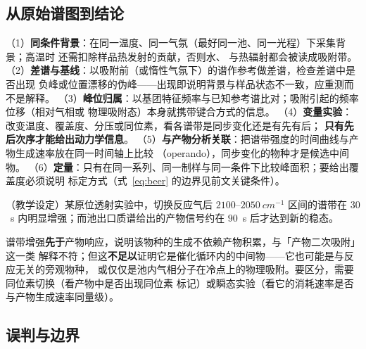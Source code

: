 \subsection{从原始谱图到结论}

\begin{dataflow}
（1）\textbf{同条件背景}：在同一温度、同一气氛（最好同一池、同一光程）下采集背景；高温时
还需扣除样品热发射的贡献，否则水、 与热辐射都会被读成吸附带。
（2）\textbf{差谱与基线}：以吸附前（或惰性气氛下）的谱作参考做差谱，检查差谱中是否出现
负峰或位置漂移的伪峰——出现即说明背景与样品状态不一致，应重测而不是解释。
（3）\textbf{峰位归属}：以基团特征频率与已知参考谱比对；吸附引起的频率位移（相对气相或
物理吸附态）本身就携带键合方式的信息。
（4）\textbf{变量实验}：改变温度、覆盖度、分压或同位素，看各谱带是同步变化还是有先有后；
\textbf{只有先后次序才能给出动力学信息}。
（5）\textbf{与产物分析关联}：把谱带强度的时间曲线与产物生成速率放在同一时间轴上比较
（operando），同步变化的物种才是候选中间物。
（6）\textbf{定量}：只有在同一系列、同一制样与同一条件下比较峰面积；要给出覆盖度必须说明
标定方式（式~\eqref{eq:beer} 的边界见前文关键条件）。
\end{dataflow}

\begin{obs}
（教学设定）某原位透射实验中，切换反应气后 $2100$--$\qty{2050}{cm^{-1}}$ 区间的谱带在
$30$~s 内明显增强；而池出口质谱给出的产物信号约在 $90$~s 后才达到新的稳态。
\end{obs}

\begin{infer}
谱带增强\textbf{先于}产物响应，说明该物种的生成不依赖产物积累，与「产物二次吸附」这一类
解释不符；但这\textbf{不足以}证明它是催化循环内的中间物——它也可能是与反应无关的旁观物种，
或仅仅是池内气相分子在冷点上的物理吸附。要区分，需要同位素切换（看产物中是否出现同位素
标记）或瞬态实验（看它的消耗速率是否与产物生成速率同量级）。
\end{infer}

\subsection{误判与边界}

